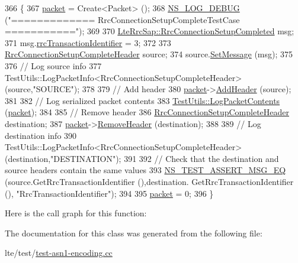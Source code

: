 \begin{DoxyCode}
366 \{
367   \hyperlink{classRrcHeaderTestCase_a6f0748c0e845f797497fbda1ca781803}{packet} = Create<Packet> ();
368   \hyperlink{group__logging_ga413f1886406d49f59a6a0a89b77b4d0a}{NS\_LOG\_DEBUG} (\textcolor{stringliteral}{"============= RrcConnectionSetupCompleteTestCase ==========="});
369 
370   \hyperlink{structns3_1_1LteRrcSap_1_1RrcConnectionSetupCompleted}{LteRrcSap::RrcConnectionSetupCompleted} msg;
371   msg.\hyperlink{structns3_1_1LteRrcSap_1_1RrcConnectionSetupCompleted_a35e8f1ef1d17066400805eb2d803db1e}{rrcTransactionIdentifier} = 3;
372 
373   \hyperlink{classns3_1_1RrcConnectionSetupCompleteHeader}{RrcConnectionSetupCompleteHeader} source;
374   source.\hyperlink{classns3_1_1RrcConnectionSetupCompleteHeader_acd1592d5ffcda03172c6d367e3097c38}{SetMessage} (msg);
375 
376   \textcolor{comment}{// Log source info}
377   TestUtils::LogPacketInfo<RrcConnectionSetupCompleteHeader> (source,\textcolor{stringliteral}{"SOURCE"});
378 
379   \textcolor{comment}{// Add header}
380   \hyperlink{classRrcHeaderTestCase_a6f0748c0e845f797497fbda1ca781803}{packet}->\hyperlink{classns3_1_1Packet_a465108c595a0bc592095cbcab1832ed8}{AddHeader} (source);
381 
382   \textcolor{comment}{// Log serialized packet contents}
383   \hyperlink{classTestUtils_a9391dac3282094e6e57c0052d88a086f}{TestUtils::LogPacketContents} (\hyperlink{classRrcHeaderTestCase_a6f0748c0e845f797497fbda1ca781803}{packet});
384 
385   \textcolor{comment}{// Remove header}
386   \hyperlink{classns3_1_1RrcConnectionSetupCompleteHeader}{RrcConnectionSetupCompleteHeader} destination;
387   \hyperlink{classRrcHeaderTestCase_a6f0748c0e845f797497fbda1ca781803}{packet}->\hyperlink{classns3_1_1Packet_a0961eccf975d75f902d40956c93ba63e}{RemoveHeader} (destination);
388 
389   \textcolor{comment}{// Log destination info}
390   TestUtils::LogPacketInfo<RrcConnectionSetupCompleteHeader> (destination,\textcolor{stringliteral}{"DESTINATION"});
391 
392   \textcolor{comment}{// Check that the destination and source headers contain the same values}
393   \hyperlink{group__testing_ga2a9d78cffb3db8e867c35fff0b698cf5}{NS\_TEST\_ASSERT\_MSG\_EQ} (source.GetRrcTransactionIdentifier (),destination.
      GetRrcTransactionIdentifier (), \textcolor{stringliteral}{"RrcTransactionIdentifier"});
394 
395   \hyperlink{classRrcHeaderTestCase_a6f0748c0e845f797497fbda1ca781803}{packet} = 0;
396 \}
\end{DoxyCode}


Here is the call graph for this function\+:




The documentation for this class was generated from the following file\+:\begin{DoxyCompactItemize}
\item 
lte/test/\hyperlink{test-asn1-encoding_8cc}{test-\/asn1-\/encoding.\+cc}\end{DoxyCompactItemize}
